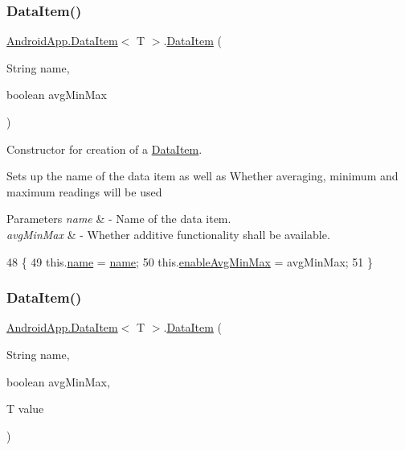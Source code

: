 \subsubsection{\texorpdfstring{Data\+Item()}{DataItem()}\hspace{0.1cm}{\footnotesize\ttfamily [1/2]}}
{\footnotesize\ttfamily \hyperlink{class_android_app_1_1_data_item}{Android\+App.\+Data\+Item}$<$ T $>$.\hyperlink{class_android_app_1_1_data_item}{Data\+Item} (\begin{DoxyParamCaption}\item[{String}]{name,  }\item[{boolean}]{avg\+Min\+Max }\end{DoxyParamCaption})\hspace{0.3cm}{\ttfamily [inline]}}



Constructor for creation of a \hyperlink{class_android_app_1_1_data_item}{Data\+Item}. 

Sets up the name of the data item as well as Whether averaging, minimum and maximum readings will be used


\begin{DoxyParams}{Parameters}
{\em name} & -\/ Name of the data item. \\
\hline
{\em avg\+Min\+Max} & -\/ Whether additive functionality shall be available. \\
\hline
\end{DoxyParams}

\begin{DoxyCode}
48                                                     \{
49         this.\hyperlink{class_android_app_1_1_data_item_a7e6d01c4d449403e707e99fce240b33b}{name} = \hyperlink{class_android_app_1_1_data_item_a7e6d01c4d449403e707e99fce240b33b}{name};
50         this.\hyperlink{class_android_app_1_1_data_item_a330d3ade00b732f202d73dbb0d3b711f}{enableAvgMinMax} = avgMinMax;
51     \}
\end{DoxyCode}
\mbox{\label{class_android_app_1_1_data_item_a46a1d40afefec40e043301faefab4670}} 
\subsubsection{\texorpdfstring{Data\+Item()}{DataItem()}\hspace{0.1cm}{\footnotesize\ttfamily [2/2]}}
{\footnotesize\ttfamily \hyperlink{class_android_app_1_1_data_item}{Android\+App.\+Data\+Item}$<$ T $>$.\hyperlink{class_android_app_1_1_data_item}{Data\+Item} (\begin{DoxyParamCaption}\item[{String}]{name,  }\item[{boolean}]{avg\+Min\+Max,  }\item[{T}]{value }\end{DoxyParamCaption})\hspace{0.3cm}{\ttfamily [inline]}}



